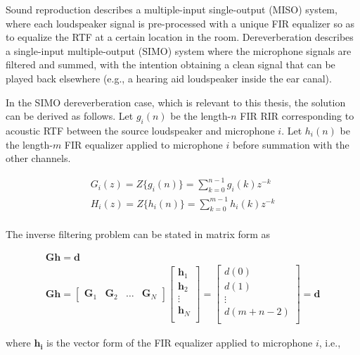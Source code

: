 Sound reproduction describes a multiple-input single-output (MISO) system, where each loudspeaker signal is pre-processed with a unique FIR equalizer so as to equalize the RTF at a certain location in the room. Dereverberation describes a single-input multiple-output (SIMO) system where the microphone signals are filtered and summed, with the intention obtaining a clean signal that can be played back elsewhere (e.g., a hearing aid loudspeaker inside the ear canal).

In the SIMO dereverberation case, which is relevant to this thesis, the solution can be derived as follows. Let $g_i(n)$ be the length-$n$ FIR RIR corresponding to acoustic RTF between the source loudspeaker and microphone $i$. Let $h_i(n)$ be the length-$m$ FIR equalizer applied to microphone $i$ before summation with the other channels. 

\begin{eqnarray}
	G_i(z) = Z\{g_i(n)\} = \sum_{k=0}^{n-1}g_i(k)z^{-k} \\
	H_i(z) = Z\{h_i(n)\} = \sum_{k=0}^{m-1}h_i(k)z^{-k} \\
\end{eqnarray}

The inverse filtering problem can be stated in matrix form as

\begin{eqnarray}
	\boldsymbol{G} \boldsymbol{h}=\boldsymbol{d} \label{eq:MINT_problem} \\
	\boldsymbol{G} \boldsymbol{h} =
	\begin{bmatrix}
		\boldsymbol{G}_1 & \boldsymbol{G}_2 & \dots& \boldsymbol{G}_N
	\end{bmatrix} 
	\begin{bmatrix}
		\boldsymbol{h}_1 \\
		\boldsymbol{h}_2 \\
		\vdots \\
		\boldsymbol{h}_N \\
	\end{bmatrix}
	=
	\begin{bmatrix}
		d(0) \\
		d(1) \\
		\vdots \\
		d(m+n-2) \\
	\end{bmatrix} 
	=
	\boldsymbol{d}
\end{eqnarray}

\noindent
where $\boldsymbol{h_i}$ is the vector form of the FIR equalizer applied to microphone $i$, i.e.,

